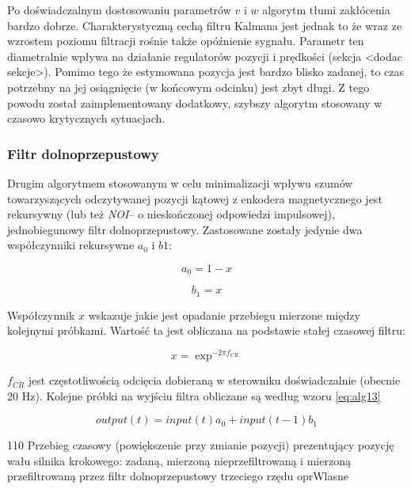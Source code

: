 Po doświadczalnym dostosowaniu parametrów $ v $ i $ w $ algorytm tłumi zakłócenia bardzo dobrze. Charakterystyczną cechą filtru Kalmana jest jednak to że wraz ze wzrostem poziomu filtracji rośnie także opóźnienie sygnału. Parametr ten diametralnie wpływa na działanie regulatorów pozycji i prędkości (sekcja <dodac sekcje>). Pomimo tego że estymowana pozycja jest bardzo blisko zadanej, to czas potrzebny na jej osiągnięcie (w końcowym odcinku) jest zbyt długi. Z tego powodu został zaimplementowany dodatkowy, szybszy algorytm stosowany w czasowo krytycznych sytuacjach.

\clearpage

\subsubsection{Filtr dolnoprzepustowy}

Drugim algorytmem stosowanym w celu minimalizacji wpływu szumów towarzyszących odczytywanej pozycji kątowej z enkodera magnetycznego jest rekursywny (lub też {\it NOI}-- o nieskończonej odpowiedzi impulsowej), jednobiegunowy filtr dolnoprzepustowy. Zastosowane zostały jedynie dwa współczynniki rekursywne $ a_0 $ i $ b1 $:

\begin{equation} \label{eq:alg10}
	a_0 = 1 - x
\end{equation}

\begin{equation} \label{eq:alg11}
	b_1 = x
\end{equation}

Współczynnik $ x $ wskazuje jakie jest opadanie przebiegu mierzone między kolejnymi próbkami. Wartość ta jest obliczana na podstawie stałej czasowej filtru:

\begin{equation} \label{eq:alg12}
	x = \exp^{-2 \pi f_{CR}}
\end{equation}

$ f_{CR} $ jest częstotliwością odcięcia dobieraną w sterowniku doświadczalnie (obecnie 20 Hz). Kolejne próbki na wyjściu filtra obliczane są według wzoru \ref{eq:alg13}

\begin{equation} \label{eq:alg13}
	output(t) = input(t) a_0 + input(t - 1) b_1 
\end{equation}

	{110}
	{Przebieg czasowy (powiększenie przy zmianie pozycji) prezentujący pozycję wału silnika krokowego: zadaną,   mierzoną nieprzefiltrowaną i mierzoną przefiltrowaną przez filtr dolnoprzepustowy trzeciego rzędu}
	{oprWlasne}
	
